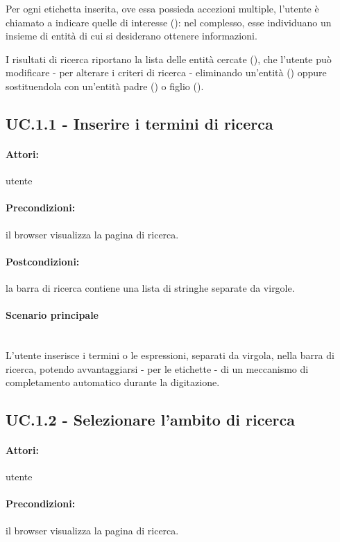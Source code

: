 \documentclass[10pt,a4paper,headinclude,footinclude,hidelinks]{scrreprt} %
\begin{document}
	Per ogni etichetta inserita, ove essa possieda accezioni multiple, l'utente è chiamato a indicare quelle di interesse (): nel complesso, esse individuano un insieme di entità di cui si desiderano ottenere informazioni.

	I risultati di ricerca riportano la lista delle entità cercate (), che l'utente può modificare - per alterare i criteri di ricerca - eliminando un'entità () oppure sostituendola con un'entità padre () o figlio ().

 	\subsection[UC.1.1]{UC.1.1 - Inserire i termini di ricerca}
	\label{ch:stage:ar:uc:1_1}
	\paragraph{Attori:}  utente
	\paragraph{Precondizioni:} il browser visualizza la pagina di ricerca.
	\paragraph{Postcondizioni:} la barra di ricerca contiene una lista di stringhe separate da virgole.
	\paragraph{Scenario principale} \hfill \\
	L'utente inserisce i termini o le espressioni, separati da virgola, nella barra di ricerca, potendo avvantaggiarsi - per le etichette - di un meccanismo di completamento automatico durante la digitazione.

	\subsection[UC.1.2]{UC.1.2 - Selezionare l'ambito di ricerca}
	\label{ch:stage:ar:uc:1_2}
	\paragraph{Attori:} utente
	\paragraph{Precondizioni:} il browser visualizza la pagina di ricerca.
\end{document}

